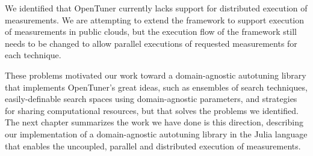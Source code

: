 We identified that OpenTuner currently lacks support for distributed execution
of measurements. We are attempting to extend the framework to support execution
of measurements in public clouds, but the execution flow of the framework still
needs to be changed to allow parallel executions of requested measurements for
each technique.

These problems motivated our work toward a domain-agnostic autotuning library
that implements OpenTuner's great ideas, such as ensembles of search
techniques, easily-definable search spaces using domain-agnostic parameters,
and strategies for sharing computational resources, but that solves the
problems we identified. The next chapter summarizes the work we have done is
this direction, describing our implementation of a domain-agnostic autotuning
library in the Julia language that enables the uncoupled, parallel and
distributed execution of measurements.
